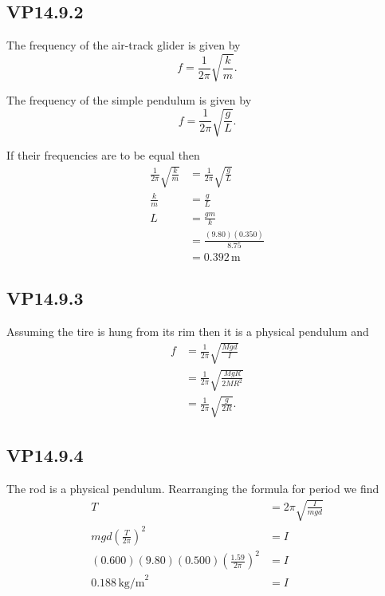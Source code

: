 \documentclass{article}
\begin{document}
\subsection{VP14.9.2}

The frequency of the air-track glider is given by \[f = \frac{1}{2\pi}\sqrt{\frac{k}{m}}.\]

The frequency of the simple pendulum is given by \[f = \frac{1}{2\pi}\sqrt{\frac{g}{L}}.\]

If their frequencies are to be equal then
\begin{align*}
  \frac{1}{2\pi}\sqrt{\frac{k}{m}} & = \frac{1}{2\pi}\sqrt{\frac{g}{L}} \\
  \frac{k}{m}                      & = \frac{g}{L}                      \\
  L                                & = \frac{gm}{k}                     \\
                                   & = \frac{(9.80)(0.350)}{8.75}       \\
                                   & = 0.392 \,\textrm{m}
\end{align*}

\subsection{VP14.9.3}

Assuming the tire is hung from its rim then it is a physical pendulum and
\begin{align*}
  f & = \frac{1}{2\pi}\sqrt{\frac{Mgd}{I}}     \\
    & = \frac{1}{2\pi}\sqrt{\frac{MgR}{2MR^2}} \\
    & = \frac{1}{2\pi}\sqrt{\frac{g}{2R}}.
\end{align*}

\subsection{VP14.9.4}

The rod is a physical pendulum. Rearranging the formula for period we find
\begin{align*}
  T                                                    & = 2\pi\sqrt{\frac{I}{mgd}} \\
  mgd\left(\frac{T}{2\pi}\right)^2                     & = I                        \\
  (0.600)(9.80)(0.500)\left(\frac{1.59}{2\pi}\right)^2 & = I                        \\
  0.188 \,\textrm{kg/m}^2                              & = I
\end{align*}
\end{document}
